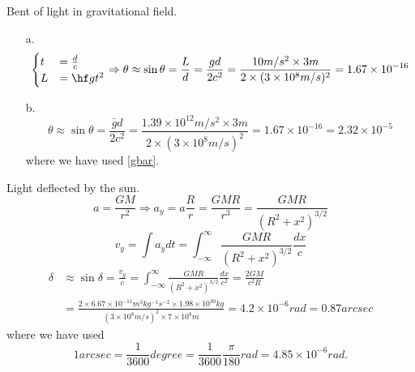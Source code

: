 \documentclass[11pt,fleqn]{book} %
\begin{document}
\begin{problem}
	Bent of light in gravitational field.\\
	\begin{enumerate}
		\item[a.]
		\begin{equation}
			\begin{cases}
				t &= \frac{d}{c}\\
				L &= \hf g t^2
			\end{cases}
		\Rightarrow \theta \approx \sin \theta = \frac{L}{d} = \frac{gd}{2c^2} = \frac{10m/s^2 \times 3m}{2\times (3\times 10^8m/s)^2} = 1.67\times 10^{-16}
		\end{equation}
		
		\item[b.] 
		\begin{equation}
			\theta \approx \sin \theta =  \frac{\bar{g}d}{2c^2} = \frac{1.39\times 10^{12} m/s^2 \times 3m}{2\times (3\times 10^8m/s)^2} = 1.67\times 10^{-16} = 2.32 \times 10^{-5}
		\end{equation}
	where we have used \eqref{gbar}.
	\end{enumerate}
\end{problem}

\begin{problem}
	Light deflected by the sun.\\
	\begin{equation}
		a = \frac{GM}{r^2} \Rightarrow a_y = a\frac{R}{r} = \frac{GMR}{r^3} = \frac{GMR}{(R^2+x^2)^{3/2}} 
	\end{equation}
\begin{equation}
	v_y = \int a_y dt = \int_{-\infty}^{\infty} \frac{GMR}{(R^2+x^2)^{3/2}}  \frac{dx}{c}
\end{equation}
\begin{equation}
	\begin{split}		
		\delta &\approx \sin\delta = \frac{v_y}{c} = \int_{-\infty}^{\infty} \frac{GMR}{(R^2+x^2)^{3/2}}  \frac{dx}{c^2} = \frac{2GM}{c^2 R} \\
		&= \frac{2\times 6.67\times 10^{-11} m^3 kg^{-1} s^{-2} \times 1.98 \times 10^{30} kg}{(3\times 10^8 m/s)^2 \times 7\times 10^8 m} = 4.2\times 10^{-6} rad = 0.87 arcsec
	\end{split}
\end{equation}
where we have used 
\begin{equation}\label{key}
	1 arcsec = \frac{1}{3600} degree = \frac{1}{3600} \frac{\pi}{180} rad = 4.85\times 10^{-6} rad.
\end{equation}
\end{problem}
\end{document}
